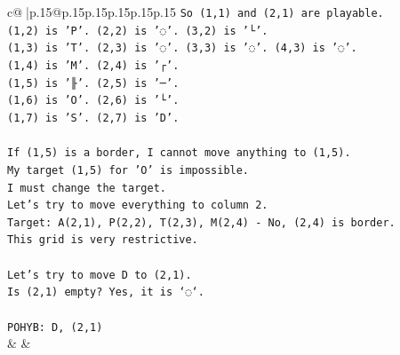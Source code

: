 \documentclass{article}
\begin{document}
{\begin{supertabular}{c@{$\;$}|p{.15\linewidth}@{}p{.15\linewidth}p{.15\linewidth}p{.15\linewidth}p{.15\linewidth}p{.15\linewidth}}
{{{\texttt{So (1,1) and (2,1) are playable.} \\
\texttt{(1,2) is 'P'. (2,2) is '◌'. (3,2) is '└'.} \\
\texttt{(1,3) is 'T'. (2,3) is '◌'. (3,3) is '◌'. (4,3) is '◌'.} \\
\texttt{(1,4) is 'M'. (2,4) is '┌'.} \\
\texttt{(1,5) is '╟'. (2,5) is '─'.} \\
\texttt{(1,6) is 'O'. (2,6) is '└'.} \\
\texttt{(1,7) is 'S'. (2,7) is 'D'.} \\
\\ 
\texttt{If (1,5) is a border, I cannot move anything to (1,5).} \\
\texttt{My target (1,5) for 'O' is impossible.} \\
\texttt{I must change the target.} \\
\texttt{Let's try to move everything to column 2.} \\
\texttt{Target: A(2,1), P(2,2), T(2,3), M(2,4) {-} No, (2,4) is border.} \\
\texttt{This grid is very restrictive.} \\
\\ 
\texttt{Let's try to move D to (2,1).} \\
\texttt{Is (2,1) empty? Yes, it is `◌`.} \\
\\ 
\texttt{POHYB: D, (2,1)} \\
            }
        }
    }
    & & \\ \\


\end{supertabular}}
\end{document}
